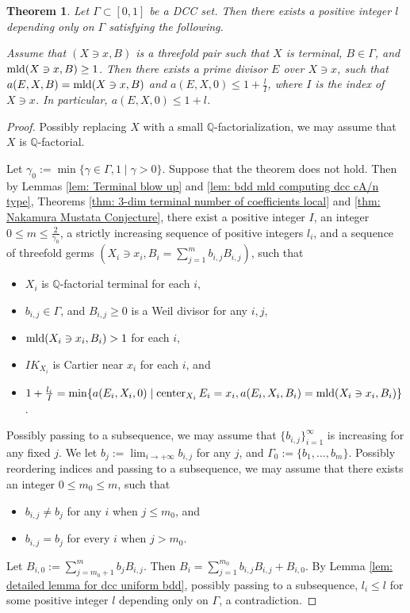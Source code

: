 \documentclass[11pt]{amsart}
\numberwithin{equation}{section}
\newcommand{\Qq}{\mathbb{Q}}
\newcommand{\Center}{\operatorname{center}}
\newcommand{\mld}{{\rm{mld}}}
\newcommand{\Ii}{{\Gamma}}
\newtheorem{thm}{Theorem}[section]
\theoremstyle{definition}
\theoremstyle{definition}
\begin{document}
\begin{thm}\label{thm: bdd mld computing dcc}
Let $\Ii\subset [0,1]$ be a DCC set. Then there exists a positive integer $l$ depending only on $\Ii$ satisfying the following. 

Assume that $(X\ni x,B)$ is a threefold pair such that $X$ is terminal, $B\in\Ii$, and $\mld(X\ni x,B)\ge 1$. Then there exists a prime divisor $E$ over $X\ni x$, such that $a(E,X,B)=\mld(X\ni x,B)$ and $a(E,X,0)\leq 1+\frac{l}{I}$, where $I$ is the index of $X\ni x$. In particular, $a(E,X,0)\leq 1+l$.
\end{thm}
\begin{proof}
Possibly replacing $X$ with a small $\Qq$-factorialization, we may assume that $X$ is $\Qq$-factorial.

Let $\gamma_0:=\min\{\gamma\in\Ii,1\mid \gamma>0\}$. Suppose that the theorem does not hold. Then by Lemmas \ref{lem: Terminal blow up} and \ref{lem: bdd mld computing dcc cA/n type}, Theorems \ref{thm: 3-dim terminal number of coefficients local} and \ref{thm: Nakamura Mustata Conjecture}, there exist a positive integer $I$, an integer $0\leq m\leq\frac{2}{\gamma_0}$, a strictly increasing sequence of positive integers $l_i$, and a sequence of threefold germs $(X_i\ni x_i,B_i=\sum_{j=1}^mb_{i,j}B_{i,j})$, such that
\begin{itemize}
    
    \item $X_i$ is $\Qq$-factorial terminal for each $i$,
    \item $b_{i,j}\in\Ii$, and $B_{i,j}\geq 0$ is a Weil divisor for any $i,j$,
    \item $\mld(X_i\ni x_i,B_i)>1$ for each $i$,
    \item $IK_{X_i}$ is Cartier near $x_i$ for each $i$, and
    \item $1+\frac{l_i}{I}=\min\{a(E_i,X_i,0)\mid \Center_{X_i}E_i=x_i,a(E_i,X_i,B_i)=\mld(X_i\ni x_i,B_i)\}$.
\end{itemize}


Possibly passing to a subsequence, we may assume that $\{b_{i,j}\}_{i=1}^{\infty}$ is increasing for any fixed $j$. We let $b_j:=\lim_{i\rightarrow+\infty}b_{i,j}$ for any $j$, and $\Ii_0:=\{b_1,\dots,b_m\}$. Possibly reordering indices and passing to a subsequence, we may assume that there exists an integer $0\leq m_0\leq m$, such that
\begin{itemize}
    \item $b_{i,j}\neq b_j$ for any $i$ when $j\leq m_0$, and
    \item $b_{i,j}=b_j$ for every $i$ when $j>m_0$.
\end{itemize}
Let $B_{i,0}:=\sum_{j=m_0+1}^{m}b_jB_{i,j}$. Then $B_i=\sum_{j=1}^{m_0}b_{i,j}B_{i,j}+B_{i,0}$. By Lemma \ref{lem: detailed lemma for dcc uniform bdd}, possibly passing to a subsequence, $l_i\le l$ for some positive integer $l$ depending only on $\Ii$, a contradiction.
\end{proof}
\end{document}
